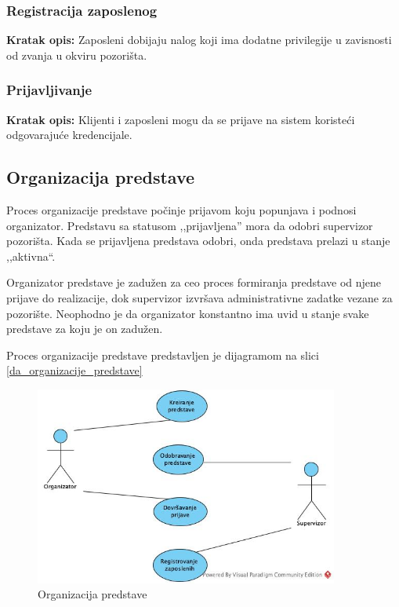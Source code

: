 \documentclass[a4paper]{article}
\begin{document}
\subsubsection{Registracija zaposlenog} 
\noindent\textbf{Kratak opis:} Zaposleni dobijaju nalog koji ima dodatne privilegije u zavisnosti 
  od zvanja u okviru pozorišta.

\subsubsection{Prijavljivanje}
\noindent\textbf{Kratak opis:} Klijenti i zaposleni mogu da se prijave na sistem koristeći odgovarajuće kredencijale.

\subsection{Organizacija predstave}
Proces organizacije predstave počinje prijavom koju popunjava i podnosi organizator. Predstavu sa statusom ,,prijavljena'' mora da odobri supervizor pozorišta. Kada se prijavljena predstava odobri, onda predstava prelazi u stanje ,,aktivna``. 

Organizator predstave je zadužen za ceo proces formiranja predstave od njene prijave do realizacije, dok supervizor izvršava administrativne zadatke vezane za pozorište. Neophodno je da organizator konstantno ima uvid u stanje svake predstave za koju je on zadužen. 

Proces organizacije predstave predstavljen je dijagramom na slici \ref{da_organizacije_predstave}

\begin{figure}[H]
  \begin{center}
      \includegraphics[width=100mm]{../images/usecase_organizacija_predstave.jpg}
  \end{center}
  \caption{Organizacija predstave}
  \label{usecase_organizacija_predstave}
\end{figure}
\end{document}
